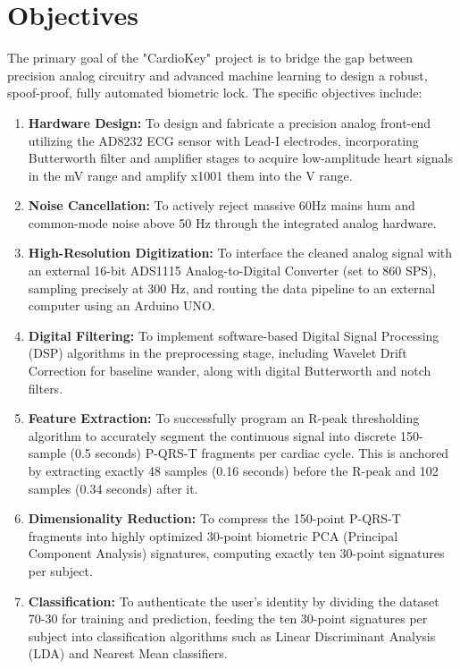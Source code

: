 \documentclass[12pt,a4paper]{report}
\begin{document}
\section{Objectives}
The primary goal of the "CardioKey" project is to bridge the gap between precision analog circuitry and advanced machine learning to design a robust, spoof-proof, fully automated biometric lock. The specific objectives include:
\begin{enumerate}
\item \textbf{Hardware Design:} To design and fabricate a precision analog front-end utilizing the AD8232 ECG sensor with Lead-I electrodes, incorporating Butterworth filter and amplifier stages to acquire low-amplitude heart signals in the mV range and amplify x1001 them into the V range.
\item \textbf{Noise Cancellation:} To actively reject massive 60Hz mains hum and common-mode noise above 50 Hz through the integrated analog hardware.
\item \textbf{High-Resolution Digitization:} To interface the cleaned analog signal with an external 16-bit ADS1115 Analog-to-Digital Converter (set to 860 SPS), sampling precisely at 300 Hz, and routing the data pipeline to an external computer using an Arduino UNO.
\item \textbf{Digital Filtering:} To implement software-based Digital Signal Processing (DSP) algorithms in the preprocessing stage, including Wavelet Drift Correction for baseline wander, along with digital Butterworth and notch filters.
\item \textbf{Feature Extraction:} To successfully program an R-peak thresholding algorithm to accurately segment the continuous signal into discrete 150-sample (0.5 seconds) P-QRS-T fragments per cardiac cycle. This is anchored by extracting exactly 48 samples (0.16 seconds) before the R-peak and 102 samples (0.34 seconds) after it.
\item \textbf{Dimensionality Reduction:} To compress the 150-point P-QRS-T fragments into highly optimized 30-point biometric PCA (Principal Component Analysis) signatures, computing exactly ten 30-point signatures per subject.
\item \textbf{Classification:} To authenticate the user's identity by dividing the dataset 70-30 for training and prediction, feeding the ten 30-point signatures per subject into classification algorithms such as Linear Discriminant Analysis (LDA) and Nearest Mean classifiers.
\end{enumerate}
\end{document}
